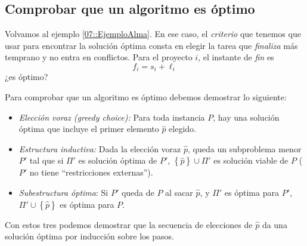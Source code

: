 \documentclass[english, spanish, fleqn, 10pt]{article}
\newcommand{\comillas}[1]{``#1''}
\numberwithin{equation}{section}
\newcommand{\llaves}[1]{\left \{ #1 \right \}}
\theoremstyle{definition}
\begin{document}
\subsection{Comprobar que un algoritmo es óptimo}
Volvamos al ejemplo \ref{07::EjemploAlma}. En ese caso, el \emph{criterio} que tenemos que usar para encontrar la solución óptima consta en elegir la tarea que \emph{finaliza} más temprano y no entra en conflictos. Para el proyecto $i$, el instante de \emph{fin} es
\begin{equation*}
f_i=s_i+\ell _i
\end{equation*}
¿es óptimo?

Para comprobar que un algoritmo es óptimo debemos demostrar lo siguiente: \begin{itemize}
	\item \emph{Elección voraz (greedy choice):} Para toda instancia $P$, hay una solución óptima que incluye el primer elemento $\hat p$ elegido.
	
	\item \emph{Estructura inductiva:} Dada la elección voraz $\hat{p}$, queda un subproblema menor $P'$ tal que si $\Pi'$ es solución óptima de $P'$, $\llaves{\hat{p}}\cup \Pi'$ es solución viable de $P$ ($P'$ no tiene \comillas{restricciones externas}).	
	
	\item \emph{Subestructura óptima}: Si $P'$ queda de $P$ al sacar $\hat p$, y  $\Pi'$ es óptima para $P'$, $\Pi'\cup\llaves{\hat{p}}$ es óptima para $P$.
\end{itemize}
Con estos tres podemos demostrar que la secuencia de elecciones de $\hat{p}$ da una solución óptima por inducción sobre los pasos.  
\end{document}
